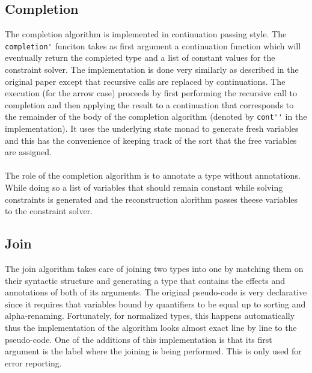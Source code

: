\documentclass[8pt]{extarticle}
\begin{document}
\subsection{Completion}
The completion algorithm is implemented in continuation passing style. The \verb+completion'+ funciton takes as first argument a continuation function which will eventually return the completed type and a list of constant values for the constraint solver. The implementation is done very similarly as described in the original paper except that recursive calls are replaced by continuations. The execution (for the arrow case) proceeds by first performing the recursive call to completion and then applying the result to a continuation that corresponds to the remainder of the body of the completion algorithm (denoted by \verb+cont''+ in the implementation). It uses the underlying state monad to generate fresh variables and this has the convenience of keeping track of the sort that the free variables are assigned.
\\\\
The role of the completion algorithm is to annotate a type without annotations. While doing so a list of variables that should remain constant while solving constraints is generated and the reconstruction alorithm passes theese variables to the constraint solver.
\subsection{Join}
The join algorithm takes care of joining two types into one by matching them on their syntactic structure and generating a type that contains the effects and annotations of both of its arguments. The original pseudo-code is very declarative since it requires that variables bound by quantifiers to be equal up to sorting and alpha-renaming. Fortunately, for normalized types, this happens automatically thus the implementation of the algorithm looks almost exact line by line to the pseudo-code. One of the additions of this implementation is that its first argument is the label where the joining is being performed. This is only used for error reporting.
\end{document}

